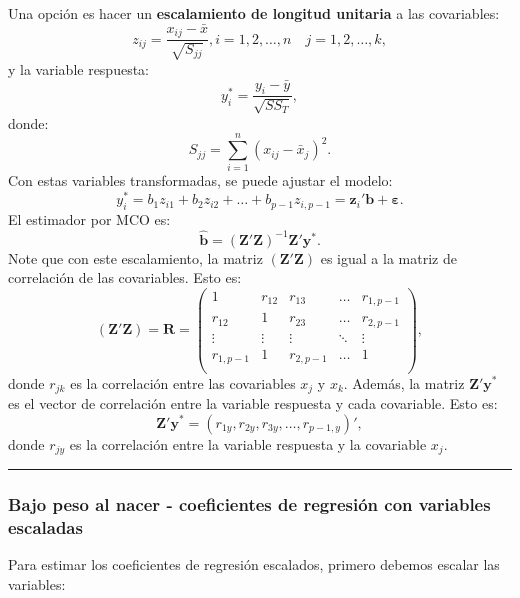 \documentclass[
]{article}
\begin{document}
Una opción es hacer un \textbf{escalamiento de longitud unitaria} a las covariables:
\[
z_{ij} = \frac{x_{ij}-\bar{x}}{\sqrt{S_{jj}}}, i=1,2,\ldots,n \quad j=1,2,\ldots,k,
\]
y la variable respuesta:
\[
y_{i}^{*} = \frac{y_{i}-\bar{y}}{\sqrt{SS_{T}}},
\]
donde:
\[
S_{jj} = \sum_{i=1}^{n}(x_{ij} - \bar{x}_{j})^{2}.
\]
Con estas variables transformadas, se puede ajustar el modelo:
\[
y_{i}^{*} = b_{1}z_{i1} + b_{2}z_{i2} + \ldots + b_{p-1}z_{i,p-1} = \boldsymbol z_{i}'\boldsymbol b+ \boldsymbol \varepsilon.
\]
El estimador por MCO es:
\[
\widehat{\boldsymbol b}= (\boldsymbol Z'\boldsymbol Z)^{-1}\boldsymbol Z'\boldsymbol y^{*}.
\]
Note que con este escalamiento, la matriz \((\boldsymbol Z'\boldsymbol Z)\) es igual a la matriz de correlación de las covariables. Esto es:
\[
(\boldsymbol Z'\boldsymbol Z) = \boldsymbol R= \begin{pmatrix}
1 & r_{12} & r_{13} & \ldots & r_{1,p-1} \\
r_{12} & 1 & r_{23} & \ldots & r_{2,p-1} \\
\vdots & \vdots & \vdots & \ddots & \vdots \\
r_{1,p-1} & 1 & r_{2,p-1} & \ldots & 1 \\
\end{pmatrix},
\]
donde \(r_{jk}\) es la correlación entre las covariables \(x_{j}\) y \(x_{k}\). Además, la matriz \(\boldsymbol Z'\boldsymbol y^{*}\) es el vector de correlación entre la variable respuesta y cada covariable. Esto es:
\[
\boldsymbol Z'\boldsymbol y^{*} = (r_{1y},r_{2y},r_{3y},\ldots,r_{p-1,y})',
\]
donde \(r_{jy}\) es la correlación entre la variable respuesta y la covariable \(x_j\).

\rule{\textwidth}{0.4pt}

\hypertarget{bajo-peso-al-nacer---coeficientes-de-regresiuxf3n-con-variables-escaladas}{%
\subsubsection*{Bajo peso al nacer - coeficientes de regresión con variables escaladas}\label{bajo-peso-al-nacer---coeficientes-de-regresiuxf3n-con-variables-escaladas}}

Para estimar los coeficientes de regresión escalados, primero debemos escalar las variables:
\end{document}
